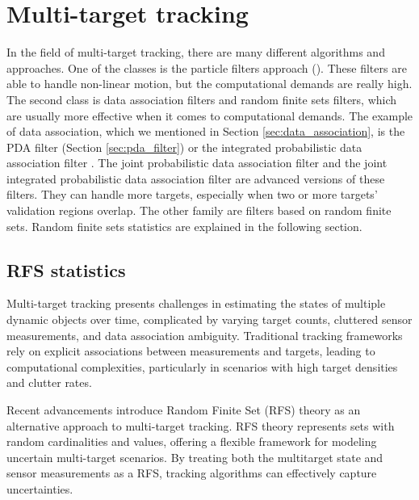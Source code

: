 \section{Multi-target tracking}
In the field of multi-target tracking, there are many different algorithms and approaches. One of the classes is the
particle filters approach (\cite{Particle_Khan2005, Particle_Gustafsson2002, Particle_Doucet2001,
    nonlinearParticleFilter}). These filters are able to handle non-linear motion, but the computational demands are
really high. The second class is data association filters and random finite sets filters, which are usually more
effective when it comes to computational
demands. The example of data association, which we mentioned in Section \ref{sec:data_association}, is the PDA filter
(Section \ref{sec:pda_filter}) or the integrated probabilistic data association filter \cite{brekke}. The joint
probabilistic
data association filter \cite{BarShalomPDA} and the joint integrated probabilistic data association filter \cite{brekke} are advanced
versions
of these
filters. They can handle more targets, especially when two or more targets' validation regions overlap. The other
family are filters based on random finite sets. Random finite sets statistics are explained in the following section.
    \subsection{RFS statistics}
Multi-target tracking presents challenges in estimating the states of multiple dynamic objects over time, complicated
by varying target counts, cluttered sensor measurements, and data association ambiguity. Traditional tracking
frameworks rely on explicit associations between measurements and targets, leading to computational complexities, particularly in scenarios with high target densities and clutter rates.

Recent advancements introduce Random Finite Set (RFS) theory as an alternative approach to multi-target tracking. RFS
theory represents sets with random cardinalities and values, offering a flexible framework for modeling uncertain
multi-target scenarios. By treating both the multitarget state and sensor measurements as a RFS, tracking algorithms
can effectively capture uncertainties.

